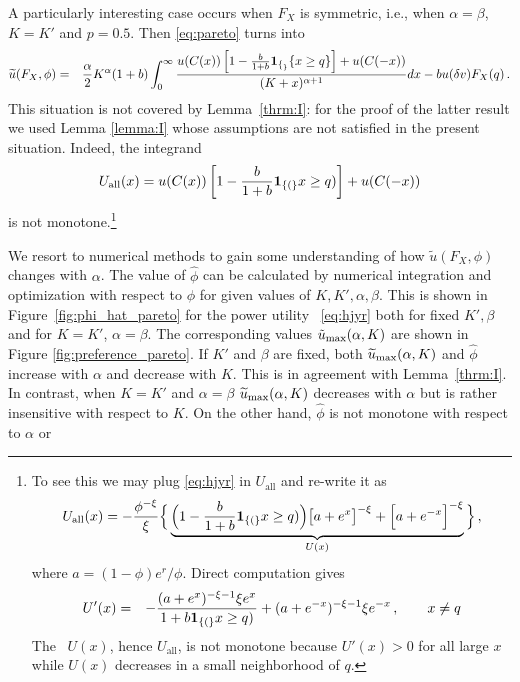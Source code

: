 A particularly interesting case occurs  when 
$F_X$ is symmetric, i.e., when $\alpha = \beta$, $K =K'$ and $p=0.5$.
Then \eqref{eq:pareto} turns into 
\begin{eqnarray}
  \widetilde u(F_X, \phi) &=& {\alpha \over 2} K^\alpha (1 + b)
  \int_{0}^\infty {
    u(C(x)) \left[
      1 - {b \over 1 + b} \mathbf{1}_{\{_\}} {\{x \ge q\}}
      \right]
    + u(C(-x))
    \over
    (K + x)^{\alpha + 1}
  } dx
  - b u(\delta v) F_X(q)\,.\nonumber\\
  \label{eq:ipf}
\end{eqnarray} 
This situation is not covered by Lemma~\ref{thrm:I}:
for the proof of the latter result we used Lemma \ref{lemma:I} whose
assumptions are not satisfied in the present situation.
Indeed, the integrand 
\[
U_{\text{all}}(x) =
u(C(x)) \left[
  1 - {b \over 1 + b}\mathbf{1}_{\{(\}}x \ge q)
  \right]
+ u(C(-x))
\]
is not monotone.\footnote{To see this we may plug \eqref{eq:hjyr} 
in $U_{\text{all}}$ and re-write it as
\[U_{\text{all}}(x) =
  -{\phi^{-\xi} \over \xi} \Big\{
  \underbrace{
    \Big(1 - {b \over 1 + b}\mathbf{1}_{\{(\}}x \ge q)\Big)
    \big[a + e^x\big]^{-\xi}
    +
    \Big[a + e^{-x}\Big]^{-\xi}
  }_{U(x)} \Big\}\,,
\]
where $a = (1 - \phi) e^r/\phi$.
Direct computation gives
\begin{eqnarray*}
  U'(x)
  &=&
  -{(a + e^x)^{-\xi - 1} \xi e^x
    \over
    1 + b \mathbf{1}_{\{(\}}x \ge  q)
  } + (a + e^{-x})^{-\xi - 1} \xi e^{-x}\,,
  \qquad x \neq q
\end{eqnarray*} 
The \fct\ $U(x)$, hence $U_{\text{all}}$, 
is not monotone because $U'(x)>0$ for all large $x$ while $U(x)$ decreases
in a small neighborhood of $q$.}
\par
We resort to numerical methods to gain some understanding of
how $\tilde u(F_X, \phi)$ changes with $\alpha$.
The value of $\hat\phi$ can be calculated
by numerical integration and optimization with respect to $\phi$ for
given values of $K, K', \alpha, \beta$.  This is shown in 
Figure~\ref{fig:phi_hat_pareto} for the power utility \fct\
\eqref{eq:hjyr} both for fixed $K', \beta$ and for $K=K'$, $\alpha=\beta$.  
The corresponding values $\tilde u_{\rm max}(\alpha, K)$
are shown in Figure \ref{fig:preference_pareto}.
If $K'$ and $\beta$ are fixed, both $\widetilde u_{\rm max}(\alpha, K)$ 
and $\hat\phi$ increase  with $\alpha$ and decrease with $K$. 
This is in agreement with Lemma~\ref{thrm:I}. 
In contrast, when $K=K'$ and $\alpha=\beta$
$\widetilde u_{\rm max}(\alpha, K)$ decreases with $\alpha$ 
but is rather insensitive with respect to $K$. On the
other hand, $\hat\phi$ is not monotone with respect to $\alpha$ or
